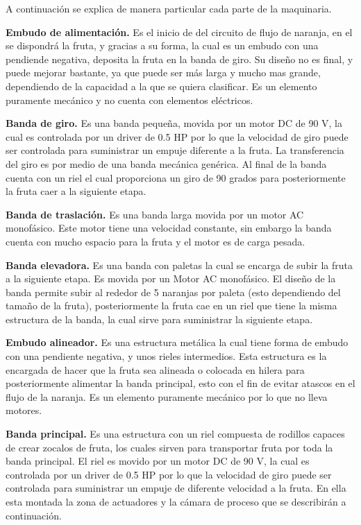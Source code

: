 \documentclass[twoside,spanish,ESP,MSc]{plantillaLabUPV}
\theoremstyle{definition}
\begin{document}
A continuación se explica de manera particular cada parte de la maquinaria.

\checkmark\textbf{Embudo de alimentación.} Es el inicio de del circuito de flujo de naranja, en el se dispondrá la fruta, y gracias a su forma, la cual es un embudo con una pendiende negativa, deposita la fruta en la banda de giro. Su diseño no es final, y puede mejorar bastante, ya que puede ser más larga y mucho mas grande, dependiendo de la capacidad a la que se quiera clasificar. Es un elemento puramente mecánico y no cuenta con elementos eléctricos.%



\checkmark\textbf{Banda de giro.} Es una banda pequeña, movida por un motor DC de 90 V, la cual es controlada por un driver de 0.5 HP por lo que la velocidad de giro puede ser controlada para suministrar un empuje diferente a la fruta. La transferencia del giro es por medio de una banda mecánica genérica. Al final de la banda cuenta con un riel el cual proporciona un giro de 90 grados para posteriormente la fruta caer a la siguiente etapa.



\checkmark\textbf{Banda de traslación.} Es una banda larga movida por un motor AC monofásico. Este motor tiene una velocidad constante, sin embargo la banda cuenta con mucho espacio para la fruta y el motor es de carga pesada.



\checkmark\textbf{Banda elevadora.} Es una banda con paletas la cual se encarga de subir la fruta a la siguiente etapa. Es movida por un Motor AC monofásico. El diseño de la banda permite subir al rededor de 5 naranjas por paleta (esto dependiendo del tamaño de la fruta), posteriormente la fruta cae en un riel que tiene la misma estructura de la banda, la cual sirve para suministrar la siguiente etapa.



\checkmark\textbf{Embudo alineador.} Es una estructura metálica la cual tiene forma de embudo con una pendiente negativa, y unos rieles intermedios. Esta estructura es la encargada de hacer que la fruta sea alineada o colocada en hilera para posteriormente alimentar la banda principal, esto con el fin de evitar atascos en el flujo de la naranja. Es un elemento puramente mecánico por lo que no lleva motores.



\checkmark\textbf{Banda principal.} Es una estructura con un riel compuesta de rodillos capaces de crear zocalos de fruta, los cuales sirven para transportar fruta por toda la banda principal. El riel es movido por un motor DC de 90 V, la cual es controlada por un driver de 0.5 HP por lo que la velocidad de giro puede ser controlada para suministrar un empuje de diferente velocidad a la fruta. En ella esta montada la zona de actuadores y la cámara de proceso que se describirán a continuación.
\end{document}
